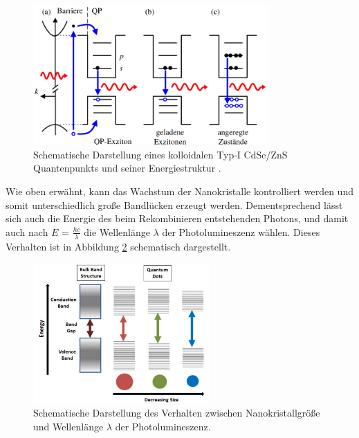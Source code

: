 \begin{figure}[hbtp]
	\centering
	\includegraphics[width=0.8\textwidth]{Abb/photoqp.png}
	\caption{Schematische Darstellung eines kolloidalen Typ-I CdSe/ZnS Quantenpunkts
   und seiner Energiestruktur \cite{lars}.}
	\label{fig:photoqp}
\end{figure}
\noindent
Wie oben erwähnt, kann das Wachstum der Nanokristalle kontrolliert werden und
somit unterschiedlich große Bandlücken erzeugt werden. Dementsprechend lässt
sich auch die Energie des beim Rekombinieren entstehenden Photons, und damit auch
nach $E$ = $\frac{hc}{\lambda}$ die Wellenlänge $\lambda$ der Photolumineszenz wählen.
Dieses Verhalten ist in Abbildung \ref{fig:size} schematisch dargestellt.
\begin{figure}[hbtp]
	\centering
	\includegraphics[width=0.6\textwidth]{Abb/size.png}
	\caption{Schematische Darstellung des Verhalten zwischen Nanokristallgröße und
  Wellenlänge $\lambda$ der Photolumineszenz\cite{size}.}
	\label{fig:size}
\end{figure}
\noindent
